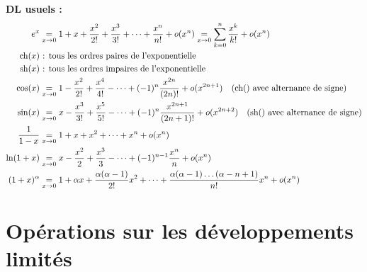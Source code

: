     \textbf{DL usuels :}
    \begin{align*}
        e^x &\underset{x \rightarrow 0}{=} 1 + x + \dfrac{x^2}{2!} + \dfrac{x^3}{3!} + \dots + \dfrac{x^n}{n!} + o(x^n) \underset{x \rightarrow 0}{=} \sum_{k=0}^n \frac{x^k}{k!} + o(x^n)\\
        \operatorname{ch}(x) &\textrm{ : tous les ordres paires de l'exponentielle}\\
        \operatorname{sh}(x) & \textrm{ : tous les ordres impaires de l'exponentielle}\\
        \cos(x) &\underset{x \rightarrow 0}{=} 1 - \dfrac{x^2}{2!} + \dfrac{x^4}{4!} - \dots + (-1)^n \dfrac{x^{2n}}{(2n)!} + o(x^{2n+1}) \quad \textrm{(ch() avec alternance de signe)}\\
        \sin(x) &\underset{x \rightarrow 0}{=} x - \dfrac{x^3}{3!} + \dfrac{x^5}{5!} - \dots + (-1)^n \dfrac{x^{2n+1}}{(2n+1)!} + o(x^{2n+2}) \quad \textrm{(sh() avec alternance de signe)}\\
        \dfrac{1}{1 - x} &\underset{x \rightarrow 0}{=} 1 + x + x^2 + \dots + x^n + o(x^n)\\
        \ln(1 + x) &\underset{x \rightarrow 0}{=} x - \dfrac{x^2}{2} + \dfrac{x^3}{3} - \dots + (-1)^{n-1} \dfrac{x^n}{n} + o(x^n)\\
        (1+x)^\alpha &\underset{x \rightarrow 0}{=} 1 + \alpha x + \dfrac{\alpha(\alpha-1)}{2!} x^2 + \dots + \dfrac{\alpha(\alpha-1)\dots(\alpha-n+1)}{n!} x^n + o(x^n)
    \end{align*}

    \newpage


\section{Opérations sur les développements limités}



